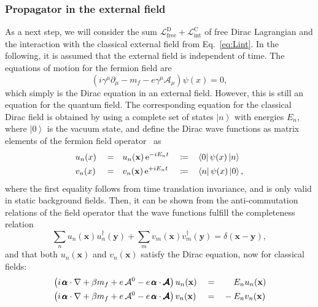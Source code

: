 \subsubsection*{Propagator in the external field}
As a next step, we will consider the sum $\mathcal{L}_{\text{free}}^{\text{D}} + \mathcal{L}_{\text{int}}^{\text{C}}$ of free Dirac Lagrangian  and the interaction with the classical external field  from Eq.~\eqref{eq:Lint}. In the following, it is assumed that the external field is independent of time. The equations of motion for the fermion field are
\begin{equation}
\left( i \gamma^\mu \partial_\mu - m_f - e \gamma^\mu \mathcal{A}_\mu \right)
\psi(x) = 0,
\end{equation}
which simply is the Dirac equation in an external field. However, this is still an equation for the quantum field. The corresponding equation for the classical Dirac field is obtained by using a complete set of states $\left|n\right>$ with energies $E_n$, where $\left|0\right>$ is the vacuum state, and define the Dirac wave functions as matrix elements of the fermion field operator~\mbox{\cite[Section 14.1]{weinberg2005}} as
\begin{alignat}{5}
&u_n(x)&&=&&u_n(\mathbf{x})\,\text{e}^{-iE_nt}&&\coloneqq&&\left<0\right|\psi(x)\left|n\right>\notag\\
&v_n(x)&&=&&v_n(\mathbf{x})\,\text{e}^{+iE_nt}&&\coloneqq&&\left<n\right|\psi(x)\left|0\right>,
\label{eq:wavefct}
\end{alignat}
where the first equality follows from time translation invariance, and is only valid in static background fields. 
Then, it can be shown from the anti-commutation relations of the field operator that the wave functions fulfill the completeness relation
\begin{equation}
\sum_n u_n(\mathbf{x})u_n^\dagger(\mathbf{y}) + \sum_m v_m(\mathbf{x})v_m^\dagger(\mathbf{y})=\delta(\mathbf{x}-\mathbf{y}),
\end{equation}
and that both $u_n(\mathbf{x})$ and $v_n(\mathbf{x})$ satisfy the Dirac equation, now for classical fields:
\begin{alignat}{3}
& \left( i\,\pmb{\alpha} \cdot \mathbf{\nabla} + \beta m_f + e\, \mathcal{A}^0 - e\, \pmb{\alpha}\cdot \pmb{\mathcal{A}} \right) u_n(\mathbf{x}) &&=&& \phantom{-}\;\, E_n u_n(\mathbf{x}) \notag\\
& \left( i\,\pmb{\alpha} \cdot \mathbf{\nabla} + \beta m_f + e\, \mathcal{A}^0 - e\, \pmb{\alpha}\cdot \pmb{\mathcal{A}} \right) v_n(\mathbf{x}) &&=&& -E_n v_n(\mathbf{x})
\label{eq:diraceq}
\end{alignat}
